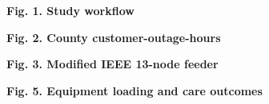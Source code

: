 \documentclass{IEEEtran}
\begin{document}
\noindent\textbf{Fig. 1. Study workflow}\par\medskip
\noindent\resizebox{.48\textwidth}{!}{}
\clearpage
\noindent\textbf{Fig. 2. County customer-outage-hours}\par\medskip
\noindent\resizebox{.85\textwidth}{!}{}
\clearpage
\noindent\textbf{Fig. 3. Modified IEEE 13-node feeder}\par\medskip
\noindent\resizebox{.43\textwidth}{!}{}
\clearpage
\noindent\textbf{Fig. 5. Equipment loading and care outcomes}\par\medskip
\noindent\scalebox{.88}{}\par\smallskip
\noindent\scalebox{.88}{\def\ConferenceResiliencePanels{}}
\end{document}
